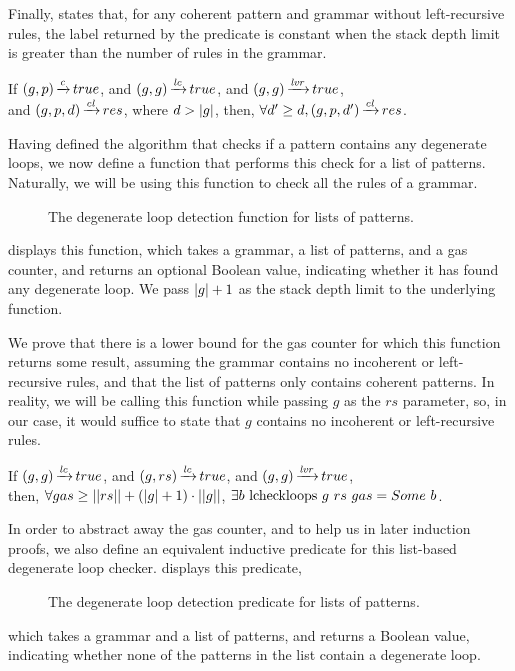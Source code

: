Finally, 
states that, for any coherent pattern and grammar
without left-recursive rules,
the label returned by the predicate is constant
when the stack depth limit is greater than
the number of rules in the grammar.

\begin{lemma}%
    If $(g,p) \operatorname{\xrightarrow{\mathit{c}}} true$,
    and $(g,g) \operatorname{\xrightarrow{\mathit{lc}}} true$,
    and $(g,g) \operatorname{\xrightarrow{\mathit{lvr}}} true$, \\
    and $(g,p,d) \operatorname{\xrightarrow{\mathit{cl}}} res$,
    where $d > |g|$,
    then, $\forall d' \ge d, (g,p,d') \operatorname{\xrightarrow{\mathit{cl}}} res$.
    \label{lemma:checkloops-d-eventual-constancy}
\end{lemma}

Having defined the algorithm
that checks if a pattern contains any degenerate loops,
we now define a function
that performs this check for a list of patterns.
Naturally, we will be using this
function to check all the rules of a grammar.
\begin{figure}
    \centering
    
    \caption{The degenerate loop detection function for lists of patterns.}
    \label{fig:lcheckloops-function}
\end{figure}
displays this function,
which takes a grammar, a list of patterns, and a gas counter,
and returns an optional Boolean value,
indicating whether it has found any degenerate loop.
We pass $|g|+1$ as
the stack depth limit to the underlying function.

We prove that there is a lower bound for the gas counter
for which this function returns some result,
assuming the grammar
contains no incoherent or left-recursive rules,
and that the list of patterns only
contains coherent patterns.
In reality, we will be calling this
function while passing $g$ as the $rs$ parameter,
so, in our case,
it would suffice to state that
$g$ contains no incoherent or left-recursive rules.

\begin{lemma}%
    If $(g,g) \operatorname{\xrightarrow{\mathit{lc}}} true$,
    and $(g,rs) \operatorname{\xrightarrow{\mathit{lc}}} true$,
    and $(g,g) \operatorname{\xrightarrow{\mathit{lvr}}} true$, \\
    then, $\forall gas \ge ||rs|| + (|g| + 1) \cdot ||g||$,
    $\exists b\ \lcheckloopscomp{g}{rs}{gas} = \Some b$.
\end{lemma}

In order to abstract away the gas counter,
and to help us in later induction proofs,
we also define an equivalent inductive predicate
for this list-based degenerate loop checker.
 displays this predicate,
\begin{figure}
    \centering
    
    \caption{The degenerate loop detection predicate for lists of patterns.}
    \label{fig:lcheckloops}
\end{figure}
which takes a grammar and a list of patterns,
and returns a Boolean value, indicating
whether none of the patterns in the list
contain a degenerate loop.

